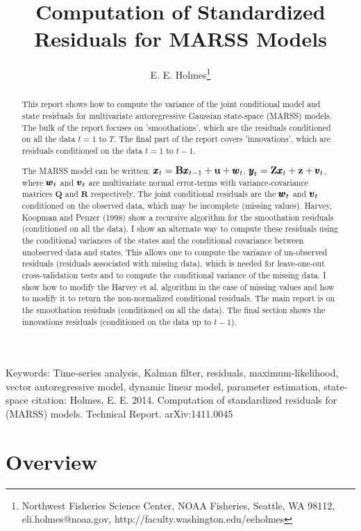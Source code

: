 \documentclass[]{article}
\def\UPS{\mbox{\boldmath $\Upsilon$}}
\def\XI{\mbox{\boldmath $\Xi$}}
\def\BB{\mbox{$\mathbf B$}}	\def\bb{\mbox{$\mathbf b$}} \def\Bb{\mbox{$\mathbf J$}} \def\Ba{\mbox{$\mathbf L$}} \def\Bm{\UPS}
\def\QQ{\mbox{$\mathbf Q$}}	 \def\qq{\mbox{$\mathbf q$}} \def\Qb{\mbox{$\mathbf G$}}  \def\Qm{\mathbb{Q}}
\def\RR{\mbox{$\mathbf R$}}	 \def\rr{\mbox{$\mathbf r$}} \def\Rb{\mbox{$\mathbf H$}}	\def\Rm{\mathbb{R}}
\def\ZZ{\mbox{$\mathbf Z$}}	\def\zz{\mbox{$\mathbf z$}}	\def\Zb{\mbox{$\mathbf M$}} \def\Za{\mbox{$\mathbf N$}} \def\Zm{\XI}
\begin{document}

\author{E. E. Holmes\footnote{Northwest Fisheries Science Center, NOAA Fisheries, Seattle, WA 98112, 
       eli.holmes@noaa.gov, http://faculty.washington.edu/eeholmes}}
\title{Computation of Standardized Residuals for MARSS Models}
\maketitle
\begin{abstract}
This report shows how to compute the variance of the joint conditional model and state residuals for multivariate autoregressive Gaussian state-space (MARSS) models. The bulk of the report focuses on 'smoothations', which are the residuals conditioned on all the data $t=1$ to $T$. The final part of the report covers 'innovations', which are residuals conditioned on the data $t=1$ to $t-1$.  

The MARSS model can be written: $\xx_t=\BB\xx_{t-1}+\uu+\ww_t$, $\yy_t=\ZZ\xx_t+\zz+\vv_t$, where $\mbox{$\pmb{w}$}_t$ and $\mbox{$\pmb{v}$}_t$ are multivariate normal error-terms with variance-covariance matrices $\QQ$ and $\RR$ respectively. The joint conditional residuals are the $\mbox{$\pmb{w}$}_t$ and $\mbox{$\pmb{v}$}_t$ conditioned on the observed data, which may be incomplete (missing values). Harvey, Koopman and Penzer (1998) show a recursive algorithm for the smoothation residuals (conditioned on all the data). I show an alternate way to compute these residuals using the conditional variances of the states and the conditional covariance between unobserved data and states. This allows one to compute the variance of un-observed residuals (residuals associated with missing data), which is needed for leave-one-out cross-validation tests and to compute the conditional variance of the missing data. I show how to modify the Harvey et al. algorithm in the case of missing values and how to modify it to return the non-normalized conditional residuals. The main report is on the smoothation residuals (conditioned on all the data). The final section shows the innovations residuals (conditioned on the data up to $t-1$).
\end{abstract}
Keywords: Time-series analysis, Kalman filter, residuals, maximum-likelihood, vector autoregressive model, dynamic linear model, parameter estimation, state-space
\vfill
{\noindent \small citation: Holmes, E. E. 2014. Computation of standardized residuals for (MARSS) models. Technical Report. arXiv:1411.0045 }
 \newpage
 
\section{Overview}
\end{document}
